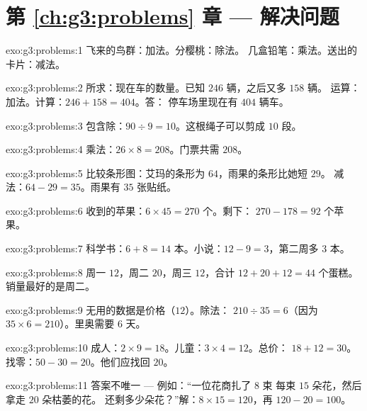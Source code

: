 \section*{第 \ref{ch:g3:problems} 章 --- 解决问题}

\begin{solution}{exo:g3:problems:1}
飞来的鸟群：加法。分樱桃：除法。
几盒铅笔：乘法。送出的卡片：减法。
\end{solution}

\begin{solution}{exo:g3:problems:2}
所求：现在车的数量。已知 $246$ 辆，之后又多 $158$ 辆。
运算：加法。计算：$246 + 158 = 404$。答：
停车场里现在有 $404$ 辆车。
\end{solution}

\begin{solution}{exo:g3:problems:3}
包含除：$90 \div 9 = 10$。这根绳子可以剪成 $10$ 段。
\end{solution}

\begin{solution}{exo:g3:problems:4}
乘法：$26 \times 8 = 208$。门票共需 $208$。
\end{solution}

\begin{solution}{exo:g3:problems:5}
比较条形图：艾玛的条形为 $64$，雨果的条形比她短 $29$。
减法：$64 - 29 = 35$。雨果有 $35$ 张贴纸。
\end{solution}

\begin{solution}{exo:g3:problems:6}
收到的苹果：$6 \times 45 = 270$ 个。剩下：
$270 - 178 = 92$ 个苹果。
\end{solution}

\begin{solution}{exo:g3:problems:7}
科学书：$6 + 8 = 14$ 本。小说：$12 - 9 = 3$，第二周多 3 本。
\end{solution}

\begin{solution}{exo:g3:problems:8}
周一 $12$，周二 $20$，周三 $12$，合计
$12 + 20 + 12 = 44$ 个蛋糕。销量最好的是周二。
\end{solution}

\begin{solution}{exo:g3:problems:9}
无用的数据是价格（$12$）。除法：
$210 \div 35 = 6$（因为 $35 \times 6 = 210$）。里奥需要 $6$ 天。
\end{solution}

\begin{solution}{exo:g3:problems:10}
成人：$2 \times 9 = 18$。儿童：$3 \times 4 = 12$。总价：
$18 + 12 = 30$。找零：$50 - 30 = 20$。他们应找回 $20$。
\end{solution}

\begin{solution}{exo:g3:problems:11}
答案不唯一 --- 例如：“一位花商扎了 $8$ 束
每束 $15$ 朵花，然后拿走 $20$ 朵枯萎的花。
还剩多少朵花？”解：$8 \times 15 = 120$，再 $120 - 20 = 100$。
\end{solution}
